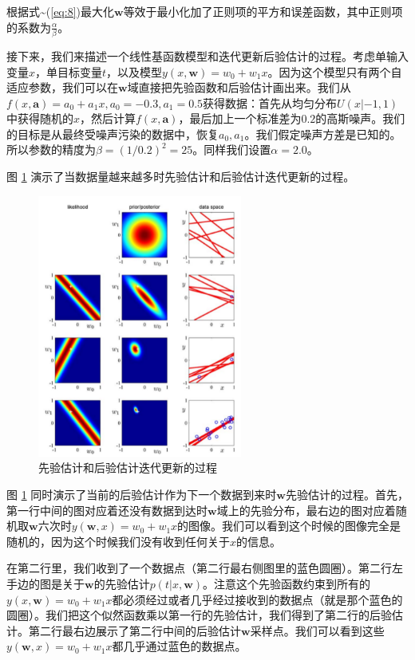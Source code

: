 \documentclass[10pt,a4paper,UTF8]{article}
\begin{document}
根据式\textasciitilde{}(\ref{eq:8})最大化\(\mathbf{w}\)等效于最小化加了正则项的平方和误差函数，其中正则项的系数为\(\frac{\alpha}{\beta}\)。

接下来，我们来描述一个线性基函数模型和迭代更新后验估计的过程。考虑单输入变量\(x\)，单目标变量\(t\)，以及模型\(y(x,\mathbf{w}) = w_{0} + w_{1}x\)。因为这个模型只有两个自适应参数，我们可以在\(\mathbf{w}\)域直接把先验函数和后验估计画出来。我们从\(f(x,\mathbf{a}) = a_{0} + a_{1}x,a_{0}=-0.3,a_{1}=0.5\)获得数据：首先从均匀分布\(U(x|-1,1)\)中获得随机的\(x\)，然后计算\(f(x,\mathbf{a})\)，最后加上一个标准差为\(0.2\)的高斯噪声。我们的目标是从最终受噪声污染的数据中，恢复\(a_{0},a_{1}\)。我们假定噪声方差是已知的。所以参数的精度为\(\beta = (1/0.2)^{2} = 25\)。同样我们设置\(\alpha = 2.0\)。

图 \ref{fig:org641ac6e} 演示了当数据量越来越多时先验估计和后验估计迭代更新的过程。
\begin{figure}[htbp]
\centering
\includegraphics[width=0.6\textwidth]{../../img/computer_prml/20170812prioriandpost.png}
\caption{\label{fig:org641ac6e}
先验估计和后验估计迭代更新的过程}
\end{figure}

图  \ref{fig:org641ac6e} 同时演示了当前的后验估计作为下一个数据到来时\(\mathbf{w}\)先验估计的过程。首先，第一行中间的图对应着还没有数据到达时\(\mathbf{w}\)域上的先验分布，最右边的图对应着随机取\(\mathbf{w}\)六次时\(y(\mathbf{w},x) = w_{0} + w_{1}x\)的图像。我们可以看到这个时候的图像完全是随机的，因为这个时候我们没有收到任何关于\(x\)的信息。

在第二行里，我们收到了一个数据点（第二行最右侧图里的蓝色圆圈）。第二行左手边的图是关于\(\mathbf{w}\)的先验估计\(p(t|x,\mathbf{w})\)。注意这个先验函数约束到所有的\(y(x,\mathbf{w}) = w_{0} + w_{1}x\)都必须经过或者几乎经过接收到的数据点（就是那个蓝色的圆圈）。我们把这个似然函数乘以第一行的先验估计，我们得到了第二行的后验估计。第二行最右边展示了第二行中间的后验估计\(\mathbf{w}\)采样点。我们可以看到这些\(y(\mathbf{w},x) = w_{0} + w_{1}x\)都几乎通过蓝色的数据点。
\end{document}
